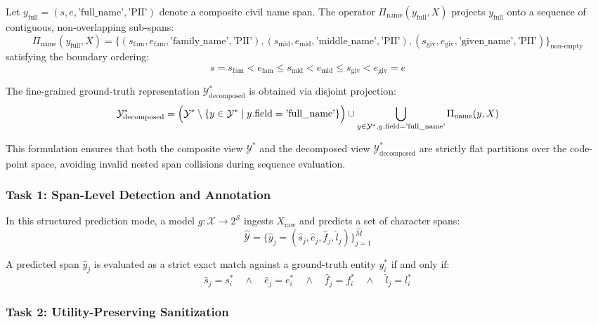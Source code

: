\documentclass[
]{article}
\begin{document}
Let \(y_{\text{full}} = (s, e, \text{'full\_name'}, \text{'PII'})\)
denote a composite civil name span. The operator
\(\Pi_{\text{name}}(y_{\text{full}}, X)\) projects \(y_{\text{full}}\)
onto a sequence of contiguous, non-overlapping sub-spans:
\[\Pi_{\text{name}}(y_{\text{full}}, X) = \{(s_{\text{fam}}, e_{\text{fam}}, \text{'family\_name'}, \text{'PII'}), (s_{\text{mid}}, e_{\text{mid}}, \text{'middle\_name'}, \text{'PII'}), (s_{\text{giv}}, e_{\text{giv}}, \text{'given\_name'}, \text{'PII'})\}_{\text{non-empty}}\]
satisfying the boundary ordering:
\[s = s_{\text{fam}} < e_{\text{fam}} \le s_{\text{mid}} < e_{\text{mid}} \le s_{\text{giv}} < e_{\text{giv}} = e\]

The fine-grained ground-truth representation
\(\mathcal{Y}^*_{\text{decomposed}}\) is obtained via disjoint
projection:
\[\mathcal{Y}^*_{\text{decomposed}} = \Bigl(\mathcal{Y}^* \setminus \{y \in \mathcal{Y}^* \mid y.\text{field} = \text{'full\_name'}\}\Bigr) \cup \bigcup_{y \in \mathcal{Y}^*, y.\text{field} = \text{'full\_name'}} \Pi_{\text{name}}(y, X)\]

This formulation ensures that both the composite view \(\mathcal{Y}^*\)
and the decomposed view \(\mathcal{Y}^*_{\text{decomposed}}\) are
strictly flat partitions over the code-point space, avoiding invalid
nested span collisions during sequence evaluation.

\subsubsection{Task 1: Span-Level Detection and
Annotation}\label{task-1-span-level-detection-and-annotation}

In this structured prediction mode, a model
\(g: \mathcal{X} \to 2^{\mathcal{S}}\) ingests \(X_{\text{raw}}\) and
predicts a set of character spans:
\[\hat{\mathcal{Y}} = \bigl\{\hat{y}_j = (\hat{s}_j, \hat{e}_j, \hat{f}_j, \hat{l}_j)\bigr\}_{j=1}^{\hat{M}}\]

A predicted span \(\hat{y}_j\) is evaluated as a strict exact match
against a ground-truth entity \(y_i^*\) if and only if:
\[\hat{s}_j = s_i^* \quad \land \quad \hat{e}_j = e_i^* \quad \land \quad \hat{f}_j = f_i^* \quad \land \quad \hat{l}_j = l_i^*\]

\subsubsection{Task 2: Utility-Preserving
Sanitization}\label{task-2-utility-preserving-sanitization}
\end{document}
